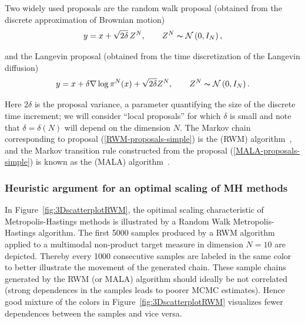 Two widely used proposals are the random walk proposal (obtained from
the discrete approximation of Brownian motion)
\begin{equation}
\label{RWM-proposals-simple}
  y = x + \sqrt{2\delta}\,Z^{N}, \qquad Z^{N} \thicksim \mathcal{N}\left( 0,I_N \right),
\end{equation}

and the Langevin proposal (obtained from the time discretization of the
Langevin diffusion)
\begin{equation}
\label{MALA-proposals-simple}
  y = x +  \delta \nabla \log \pi^{N} (x) + \sqrt{2\delta} Z^N, \qquad Z^{N} \thicksim \mathcal{N}\left( 0,I_N \right).
\end{equation}

Here $ 2 \delta $ is the proposal variance, a parameter quantifying the size of the discrete time increment; we will consider “local proposals” for which $ \delta $ is
small and note that $ \delta = \delta(N) $ will depend on the dimension $N$. The Markov chain corresponding to proposal (\ref{RWM-proposals-simple}) is the (RWM) algorithm~\autocite{Metropolis1953}, and the Markov transition rule constructed from the proposal (\ref{MALA-proposals-simple}) is known as the (MALA) algorithm~\autocite{Robert2005}.


\subsubsection*{Heuristic argument for an optimal scaling of MH methods}

In Figure~\ref{fig:3DscatterplotRWM}, the opitimal scaling characteristic of Metropolis-Hastings methods is illustrated by a Random Walk Metropolis-Hastings algorithm. The first 5000 samples produced by a RWM algorithm applied to a multimodal non-product target measure in dimension $N=10$ are depicted. Thereby every 1000 consecutive samples are labeled in the same color to better illustrate the movement of the generated chain. These sample chains generated by the RWM (or MALA) algorithm should ideally be not correlated (strong dependences in the samples leads to poorer MCMC estimates). Hence good mixture of the colors in Figure~\ref{fig:3DscatterplotRWM} visualizes fewer dependences between the samples and vice versa. 


